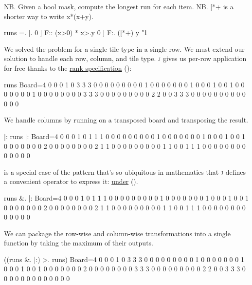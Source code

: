 \documentclass{article}
\begin{document}
\begin{code}[j]
   NB. Given a bool mask, compute the longest run for each item.
   NB. [*+ is a shorter way to write {{x*(x+y)}}.

   runs =. {{ |. 0 ] F:: {{ (x>0) * x>.y }} 0 ] F:. ([*+) y }}"1
\end{code}

We solved the problem for a single tile type in a single row.
We must extend our solution to handle each row, column, and tile type.
\textsc{j} gives us per-row application for free thanks to the  \href{https://code.jsoftware.com/wiki/Vocabulary/quote}{rank specification} ():

\begin{code}[j]
   runs Board=4
0 0 0 1 0 3 3 3 0
0 0 0 0 0 0 0 0 1
0 0 0 0 0 0 0 1 0
0 0 1 0 0 1 0 0 0
0 0 0 0 1 0 0 0 0
0 0 0 0 3 3 3 0 0
0 0 0 0 0 0 0 2 2
0 0 3 3 3 0 0 0 0
0 0 0 0 0 0 0 0 0
\end{code}

We handle columns by running  on a transposed board and transposing the result.

\begin{code}[j]
   |: runs |: Board=4
0 0 0 1 0 1 1 1 0
0 0 0 0 0 0 0 0 1
0 0 0 0 0 0 0 1 0
0 0 1 0 0 1 0 0 0
0 0 0 0 2 0 0 0 0
0 0 0 0 2 1 1 0 0
0 0 0 0 0 0 0 1 1
0 0 1 1 1 0 0 0 0
0 0 0 0 0 0 0 0 0
\end{code}

 is a special case of the  pattern
that's so ubiquitous in mathematics that \textsc{j} defines a convenient operator to express it: \href{https://code.jsoftware.com/wiki/Vocabulary/ampdot}{under} ().

\begin{code}[j]
   runs &. |: Board=4
0 0 0 1 0 1 1 1 0
0 0 0 0 0 0 0 0 1
0 0 0 0 0 0 0 1 0
0 0 1 0 0 1 0 0 0
0 0 0 0 2 0 0 0 0
0 0 0 0 2 1 1 0 0
0 0 0 0 0 0 0 1 1
0 0 1 1 1 0 0 0 0
0 0 0 0 0 0 0 0 0
\end{code}

We can package the row-wise and column-wise transformations into a single function by taking the maximum of their outputs.

\begin{code}[j]
   ((runs &. |:) >. runs) Board=4
0 0 0 1 0 3 3 3 0
0 0 0 0 0 0 0 0 1
0 0 0 0 0 0 0 1 0
0 0 1 0 0 1 0 0 0
0 0 0 0 2 0 0 0 0
0 0 0 0 3 3 3 0 0
0 0 0 0 0 0 0 2 2
0 0 3 3 3 0 0 0 0
0 0 0 0 0 0 0 0 0
\end{code}
\end{document}
